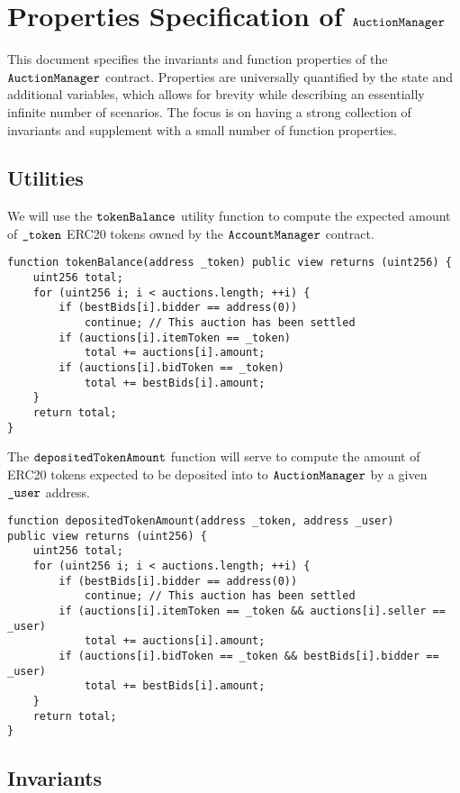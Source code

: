\documentclass[a4paper,10pt]{article}
\begin{document}
\section*{Properties Specification of $\texttt{AuctionManager}$}

This document specifies the invariants and function properties of the $\texttt{AuctionManager}$
contract. Properties are universally quantified by the state and additional variables,
which allows for brevity while describing an essentially infinite number of scenarios.
The focus is on having a strong collection of invariants and supplement with a small
number of function properties.

\subsection*{Utilities}
We will use the $\texttt{tokenBalance}$ utility function to compute the expected amount of
$\texttt{\_token}$ ERC20 tokens owned by the $\texttt{AccountManager}$ contract.

\begin{lstlisting}
function tokenBalance(address _token) public view returns (uint256) {
    uint256 total;
    for (uint256 i; i < auctions.length; ++i) {
        if (bestBids[i].bidder == address(0))
            continue; // This auction has been settled
        if (auctions[i].itemToken == _token)
            total += auctions[i].amount;
        if (auctions[i].bidToken == _token)
            total += bestBids[i].amount;
    }
    return total;
}
\end{lstlisting}

The $\texttt{depositedTokenAmount}$ function will serve to compute the amount of ERC20 tokens
expected to be deposited into to $\texttt{AuctionManager}$ by a given $\texttt{\_user}$ address.

\begin{lstlisting}
function depositedTokenAmount(address _token, address _user)
public view returns (uint256) {
    uint256 total;
    for (uint256 i; i < auctions.length; ++i) {
        if (bestBids[i].bidder == address(0))
            continue; // This auction has been settled
        if (auctions[i].itemToken == _token && auctions[i].seller == _user)
            total += auctions[i].amount;
        if (auctions[i].bidToken == _token && bestBids[i].bidder == _user)
            total += bestBids[i].amount;
    }
    return total;
}
\end{lstlisting}

\subsection*{Invariants}
\end{document}
